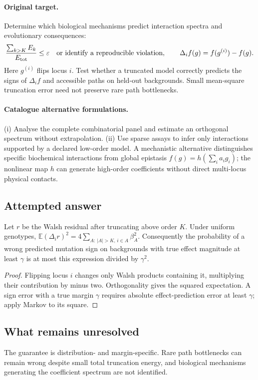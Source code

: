 \documentclass[11pt]{article}
\begin{document}
\paragraph{Original target.}
Determine which biological mechanisms predict interaction spectra and evolutionary consequences:
\[
\frac{\sum_{k>K}E_k}{E_{\rm tot}}\leq\varepsilon
\quad\text{or identify a reproducible violation},
\qquad
\Delta_if(g)=f(g^{(i)})-f(g).
\]
Here $g^{(i)}$ flips locus $i$. Test whether a truncated model correctly predicts the signs of $\Delta_i f$ and accessible paths on held-out backgrounds. Small mean-square truncation error need not preserve rare path bottlenecks.
\paragraph{Catalogue alternative formulations.}
(i) Analyse the complete combinatorial panel and estimate an orthogonal spectrum without extrapolation. (ii) Use sparse assays to infer only interactions supported by a declared low-order model. A mechanistic alternative distinguishes specific biochemical interactions from global epistasis $f(g)=h(\sum_i a_i g_i)$; the nonlinear map $h$ can generate high-order coefficients without direct multi-locus physical contacts.
\subsection{Attempted answer}
\begin{proposition}
Let $r$ be the Walsh residual after truncating above order $K$. Under uniform genotypes, $\mathbb{E}(\Delta_i r)^2=4\sum_{A:\,|A|>K,\,i\in A}\beta_A^2$. Consequently the probability of a wrong predicted mutation sign on backgrounds with true effect magnitude at least $\gamma$ is at most this expression divided by $\gamma^2$.
\end{proposition}
\begin{proof}
Flipping locus $i$ changes only Walsh products containing it, multiplying their contribution by minus two. Orthogonality gives the squared expectation. A sign error with a true margin $\gamma$ requires absolute effect-prediction error at least $\gamma$; apply Markov to its square.
\end{proof}
\subsection{What remains unresolved}
The guarantee is distribution- and margin-specific. Rare path bottlenecks can remain wrong despite small total truncation energy, and biological mechanisms generating the coefficient spectrum are not identified.
\end{document}

